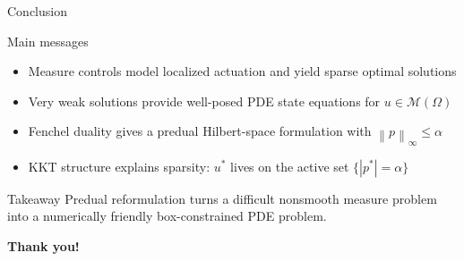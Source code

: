 \documentclass[aspectratio=169]{beamer}
\newcommand{\Om}{\Omega}
\newcommand{\M}{\mathcal{M}}
\newcommand{\norm}[1]{\left\lVert #1\right\rVert}
\begin{document}


\begin{frame}{Conclusion}
\begin{block}{Main messages}
\begin{itemize}
  \item Measure controls model localized actuation and yield sparse optimal solutions
  \item Very weak solutions provide well-posed PDE state equations for $u\in\M(\Om)$
  \item Fenchel duality gives a predual Hilbert-space formulation with $\norm{p}_\infty\le \alpha$
  \item KKT structure explains sparsity: $u^\ast$ lives on the active set $\{|p^\ast|=\alpha\}$ 
\end{itemize}
\end{block}

\begin{alertblock}{Takeaway}
Predual reformulation turns a difficult nonsmooth measure problem into a numerically friendly box-constrained PDE problem.
\end{alertblock}

\bigskip
\centering
\textbf{Thank you!}
\end{frame}
\end{document}
